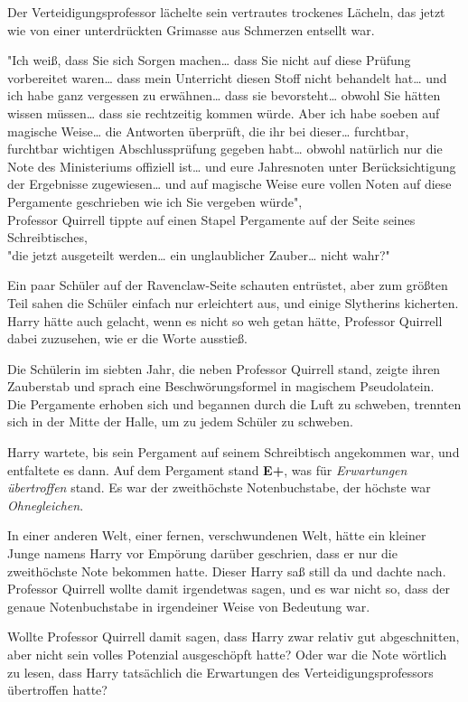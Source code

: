{Der Verteidigungsprofessor lächelte sein vertrautes trockenes Lächeln, das jetzt wie von einer unterdrückten Grimasse aus Schmerzen entsellt war.

"Ich weiß, dass Sie sich Sorgen machen… dass Sie nicht auf diese Prüfung vorbereitet waren… dass mein Unterricht diesen Stoff nicht behandelt hat… und ich habe ganz vergessen zu erwähnen… dass sie bevorsteht… obwohl Sie hätten wissen müssen… dass sie rechtzeitig kommen würde. Aber ich habe soeben auf magische Weise… die Antworten überprüft, die ihr bei dieser… furchtbar, furchtbar wichtigen Abschlussprüfung gegeben habt… obwohl natürlich nur die Note des Ministeriums offiziell ist… und eure Jahresnoten unter Berücksichtigung der Ergebnisse zugewiesen… und auf magische Weise eure vollen Noten auf diese Pergamente geschrieben wie ich Sie vergeben würde",\\ Professor Quirrell tippte auf einen Stapel Pergamente auf der Seite seines Schreibtisches,\\ "die jetzt ausgeteilt werden… ein unglaublicher Zauber… nicht wahr?"

Ein paar Schüler auf der Ravenclaw-Seite schauten entrüstet, aber zum größten Teil sahen die Schüler einfach nur erleichtert aus, und einige Slytherins kicherten. Harry hätte auch gelacht, wenn es nicht so weh getan hätte, Professor Quirrell dabei zuzusehen, wie er die Worte ausstieß.

Die Schülerin im siebten Jahr, die neben Professor Quirrell stand, zeigte ihren Zauberstab und sprach eine Beschwörungsformel in magischem Pseudolatein.\\ Die Pergamente erhoben sich und begannen durch die Luft zu schweben, trennten sich in der Mitte der Halle, um zu jedem Schüler zu schweben.

Harry wartete, bis sein Pergament auf seinem Schreibtisch angekommen war, und entfaltete es dann. Auf dem Pergament stand \textbf{E+}, was für \emph{Erwartungen übertroffen} stand. Es war der zweithöchste Notenbuchstabe, der höchste war \emph{Ohnegleichen}.

In einer anderen Welt, einer fernen, verschwundenen Welt, hätte ein kleiner Junge namens Harry vor Empörung darüber geschrien, dass er nur die zweithöchste Note bekommen hatte. Dieser Harry saß still da und dachte nach. Professor Quirrell wollte damit irgendetwas sagen, und es war nicht so, dass der genaue Notenbuchstabe in irgendeiner Weise von Bedeutung war.

Wollte Professor Quirrell damit sagen, dass Harry zwar relativ gut abgeschnitten, aber nicht sein volles Potenzial ausgeschöpft hatte? Oder war die Note wörtlich zu lesen, dass Harry tatsächlich die Erwartungen des Verteidigungsprofessors übertroffen hatte?

}
